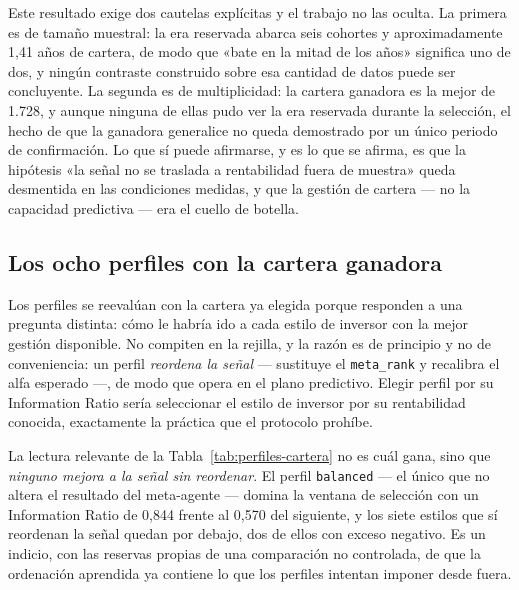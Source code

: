 Este resultado exige dos cautelas explícitas y el trabajo no las oculta. La primera es de tamaño
muestral: la era reservada abarca seis cohortes y aproximadamente 1,41 años de cartera, de modo que
«bate en la mitad de los años» significa uno de dos, y ningún contraste construido sobre esa
cantidad de datos puede ser concluyente. La segunda es de multiplicidad: la cartera ganadora es la
mejor de 1.728, y aunque ninguna de ellas pudo ver la era reservada durante la selección, el hecho
de que la ganadora generalice no queda demostrado por un único periodo de confirmación. Lo que sí
puede afirmarse, y es lo que se afirma, es que la hipótesis «la señal no se traslada a rentabilidad
fuera de muestra» queda desmentida en las condiciones medidas, y que la gestión de cartera --- no la
capacidad predictiva --- era el cuello de botella.

\subsection*{Los ocho perfiles con la cartera ganadora}

\begin{table}[H]
  \centering
  \small
  \caption{Los ocho perfiles de inversor evaluados con la cartera ganadora.}
  \label{tab:perfiles-cartera}
  
  \caption*{Fuente: . Las columnas de selección se miden
  sobre 2015--2024 y las de la era reservada sobre 2025--2026. Ningún perfil se elige por su
  Information Ratio.}
\end{table}

Los perfiles se reevalúan con la cartera ya elegida porque responden a una pregunta distinta: cómo
le habría ido a cada estilo de inversor con la mejor gestión disponible. No compiten en la rejilla,
y la razón es de principio y no de conveniencia: un perfil \emph{reordena la señal} --- sustituye el
\texttt{meta\_rank} y recalibra el alfa esperado ---, de modo que opera en el plano predictivo.
Elegir perfil por su Information Ratio sería seleccionar el estilo de inversor por su rentabilidad
conocida, exactamente la práctica que el protocolo prohíbe.

La lectura relevante de la Tabla~\ref{tab:perfiles-cartera} no es cuál gana, sino que \emph{ninguno
mejora a la señal sin reordenar}. El perfil \texttt{balanced} --- el único que no altera el
resultado del meta-agente --- domina la ventana de selección con un Information Ratio de 0,844
frente al 0,570 del siguiente, y los siete estilos que sí reordenan la señal quedan por debajo, dos
de ellos con exceso negativo. Es un indicio, con las reservas propias de una comparación no
controlada, de que la ordenación aprendida ya contiene lo que los perfiles intentan imponer desde
fuera.

